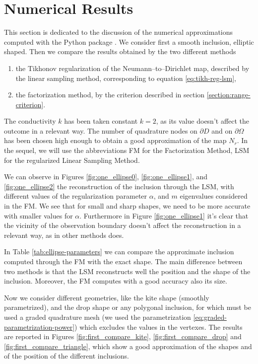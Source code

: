 \section{Numerical Results}
This section is dedicated to the discussion of the numerical approximations computed with the 
Python package \cite{}.
We consider first a smooth inclusion, elliptic shaped. Then we compare the results obtained by 
the two different methods
\begin{enumerate}
 \item the Tikhonov regularization of the Neumann--to--Dirichlet map, described by the linear
 sampling method, corresponding to equation \eqref{eq:tikh-reg-lsm},
 \item the factorization method, by the criterion described in section \ref{section:range-criterion}.
\end{enumerate}
The conductivity $k$ has been taken constant $k=2$, as its value doesn't 
affect the outcome in a relevant way. The number of quadrature nodes 
on $\partial D$ and on $\partial \Omega$ has been chosen high enough to obtain a good approximation 
of the map $N_r$.
In the sequel, we will use the abbreviations FM for the Factorization Method, LSM for the regularized 
Linear Sampling Method.
\par
We can observe in Figures 
\ref{fig:one_ellipse0}, \ref{fig:one_ellipse1}, and \ref{fig:one_ellipse2} the 
reconstruction of the inclusion through the LSM, with different values of 
the regularization parameter $\alpha$, and $m$ eigenvalues considered in the FM. We see that for small and sharp shapes, 
we need to be more accurate with smaller values for $\alpha$. Furthermore in Figure \ref{fig:one_ellipse1}
it's clear that the vicinity of the observation boundary doesn't affect the reconstruction in a relevant
way, as in other methods does.
\par
In Table \ref{tab:ellipse-parameters} we can compare the approximate inclusion 
computed through the FM with the exact shape.
The main difference between two methods is that the LSM reconstructs well the position and the shape 
of the inclusion. Moreover, the FM computes with a good accuracy also its size. 



\noindent
Now we consider different geometries, like the kite shape (smoothly parametrized), 
and the drop shape or any polygonal inclusion, for which must be 
used a graded quadrature mesh 
(we used the parametrization \eqref{eq:graded-parametrization-power}) which excludes the 
values in the vertexes. 
The results are reported in Figures \ref{fig:first_compare_kite}, \ref{fig:first_compare_drop} 
and \ref{fig:first_compare_triangle}, which show a good approximation of the shapes and 
of the position of the different inclusions. 

